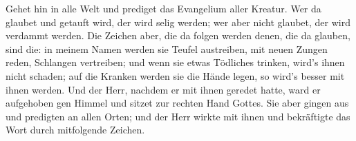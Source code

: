Gehet hin in alle Welt und prediget das Evangelium aller Kreatur.
 Wer da glaubet und getauft wird, der wird selig werden;
wer aber nicht glaubet, der wird verdammt werden.  Die
Zeichen aber, die da folgen werden denen, die da glauben, sind die: in
meinem Namen werden sie Teufel austreiben, mit neuen Zungen reden,
 Schlangen vertreiben; und wenn sie etwas Tödliches
trinken, wird's ihnen nicht schaden; auf die Kranken werden sie die
Hände legen, so wird's besser mit ihnen werden.  Und der
Herr, nachdem er mit ihnen geredet hatte, ward er aufgehoben gen Himmel
und sitzet zur rechten Hand Gottes.  Sie aber gingen aus
und predigten an allen Orten; und der Herr wirkte mit ihnen und
bekräftigte das Wort durch mitfolgende Zeichen.
